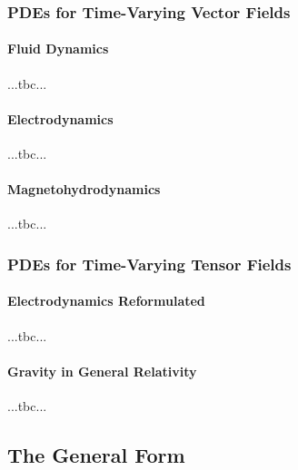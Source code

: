 \subsubsection{PDEs for Time-Varying Vector Fields}

\paragraph{Fluid Dynamics} ...tbc...



\paragraph{Electrodynamics} ...tbc...

\paragraph{Magnetohydrodynamics} ...tbc...




\subsubsection{PDEs for Time-Varying Tensor Fields}

\paragraph{Electrodynamics Reformulated} ...tbc...

\paragraph{Gravity in General Relativity} ...tbc...




\subsection{The General Form}

